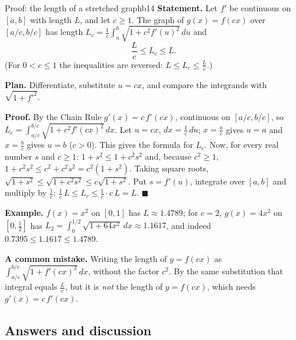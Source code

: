 \documentclass[11pt]{article}
\begin{document}
\begin{exmp}{Proof: the length of a stretched graph}{b14}
\textbf{Statement.} Let $f'$ be continuous on $[a,b]$ with length $L$, and let $c\ge1$. The graph of $g(x)=f(cx)$ over $[a/c,b/c]$ has length $L_c=\frac1c\int_a^b\sqrt{1+c^2f'(u)^2}\,du$ and
\[
\frac Lc\le L_c\le L .
\]
(For $0<c\le1$ the inequalities are reversed: $L\le L_c\le\frac Lc$.)

\textbf{Plan.} Differentiate, substitute $u=cx$, and compare the integrands with $\sqrt{1+f'^2}$.

\textbf{Proof.} By the Chain Rule $g'(x)=c\,f'(cx)$, continuous on $[a/c,b/c]$, so $L_c=\int_{a/c}^{b/c}\sqrt{1+c^2f'(cx)^2}\,dx$. Let $u=cx$, $dx=\frac1c\,du$; $x=\frac ac$ gives $u=a$ and $x=\frac bc$ gives $u=b$ ($c>0$). This gives the formula for $L_c$. Now, for every real number $s$ and $c\ge1$: $1+s^2\le1+c^2s^2$ and, because $c^2\ge1$, $1+c^2s^2\le c^2+c^2s^2=c^2(1+s^2)$. Taking square roots, $\sqrt{1+s^2}\le\sqrt{1+c^2s^2}\le c\sqrt{1+s^2}$. Put $s=f'(u)$, integrate over $[a,b]$ and multiply by $\frac1c$: $\frac1c\,L\le L_c\le\frac1c\cdot c\,L=L$. $\blacksquare$

\textbf{Example.} $f(x)=x^2$ on $[0,1]$ has $L\approx1.4789$; for $c=2$, $g(x)=4x^2$ on $[0,\frac12]$ has $L_2=\int_0^{1/2}\sqrt{1+64x^2}\,dx\approx1.1617$, and indeed $0.7395\le1.1617\le1.4789$.

\textbf{A common mistake.} Writing the length of $y=f(cx)$ as $\int_{a/c}^{b/c}\sqrt{1+f'(cx)^2}\,dx$, without the factor $c^2$. By the same substitution that integral equals $\frac Lc$, but it is \emph{not} the length of $y=f(cx)$, which needs $g'(x)=c\,f'(cx)$.
\end{exmp}

\subsection*{Answers and discussion}
\end{document}

